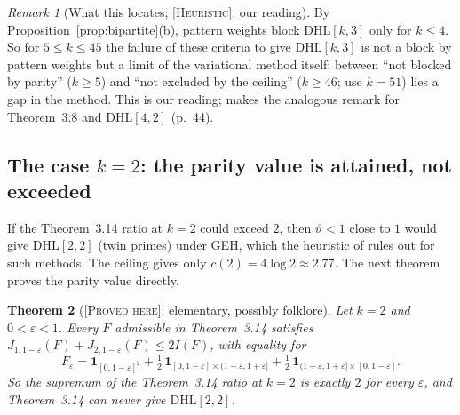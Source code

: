 \documentclass[11pt]{amsart}
\newtheorem{theorem}{Theorem}[section]
\theoremstyle{definition}
\theoremstyle{remark}
\newtheorem{remark}[theorem]{Remark}
\newcommand{\lbl}[1]{\textup{\textsc{[#1]}}}
\begin{document}
\begin{remark}[What this locates; \lbl{Heuristic}, our reading]\label{rem:ceil-locates}
By Proposition~\ref{prop:bipartite}(b), pattern weights block
$\mathrm{DHL}[k,3]$ only for $k\le4$. So for $5\le k\le45$ the failure of these
criteria to give $\mathrm{DHL}[k,3]$ is not a block by pattern weights but a limit of the
variational method itself: between ``not blocked by parity'' ($k\ge5$) and
``not excluded by the ceiling'' ($k\ge46$; \cite{PM8b} use $k=51$) lies a gap
in the method. This is our reading; \cite[Corollary~6.4]{PM8b} makes the
analogous remark for Theorem~3.8 and $\mathrm{DHL}[4,2]$ (p.~44).
\end{remark}

\subsection{The case \texorpdfstring{$k=2$}{k=2}: the parity value is attained, not exceeded}

If the Theorem~3.14 ratio at $k=2$ could exceed $2$, then $\vartheta<1$ close
to $1$ would give $\mathrm{DHL}[2,2]$ (twin primes) under GEH, which the
heuristic of \cite[\S8]{PM8b} rules out for such methods. The ceiling gives
only $c(2)=4\log2\approx2.77$. The next theorem proves the parity value
directly.

\begin{theorem}[\lbl{Proved here}; elementary, possibly folklore]\label{thm:k2}
Let $k=2$ and $0<\varepsilon<1$. Every $F$ admissible in Theorem~3.14 satisfies
$J_{1,1-\varepsilon}(F)+J_{2,1-\varepsilon}(F)\le2I(F)$, with equality for
\[
F_\varepsilon=\mathbf 1_{[0,1-\varepsilon]^2}+\tfrac12\,\mathbf 1_{[0,1-\varepsilon]\times(1-\varepsilon,1+\varepsilon]}
+\tfrac12\,\mathbf 1_{(1-\varepsilon,1+\varepsilon]\times[0,1-\varepsilon]}.
\]
So the supremum of the Theorem~3.14 ratio at $k=2$ is exactly $2$ for every
$\varepsilon$, and Theorem~3.14 can never give $\mathrm{DHL}[2,2]$.
\end{theorem}
\end{document}
